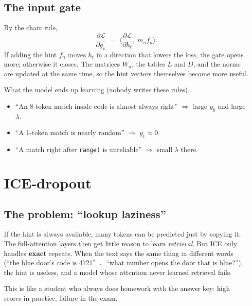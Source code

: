 \documentclass[11pt]{article}
\begin{document}
\subsection*{The input gate}
By the chain rule,
\[
\frac{\partial \mathcal{L}}{\partial g_n} \;=\; \Big\langle \frac{\partial \mathcal{L}}{\partial h_t},\ m_n f_n \Big\rangle .
\]
If adding the hint $f_n$ moves $h_t$ in a direction that lowers the loss, the gate opens more; otherwise it closes. The matrices $W_n$, the tables $L$ and $D$, and the norms are updated at the same time, so the hint vectors themselves become more useful.

\begin{example}{What the model ends up learning (nobody writes these rules)}
\begin{itemize}
  \item ``An 8-token match inside code is almost always right'' $\Rightarrow$ large $g_8$ and large $\lambda$.
  \item ``A 1-token match is nearly random'' $\Rightarrow$ $g_1 \approx 0$.
  \item ``A match right after \texttt{range(} is unreliable'' $\Rightarrow$ small $\lambda$ there.
\end{itemize}
\end{example}

\section{ICE-dropout}

\subsection*{The problem: ``lookup laziness''}
If the hint is always available, many tokens can be predicted just by copying it. The full-attention layers then get little reason to learn \emph{retrieval}. But ICE only handles \textbf{exact} repeats. When the text says the same thing in different words (``the blue door's code is 4721'' \dots\ ``what number opens the door that is blue?''), the hint is useless, and a model whose attention never learned retrieval fails.

This is like a student who always does homework with the answer key: high scores in practice, failure in the exam.
\end{document}
